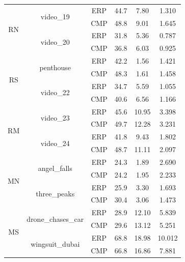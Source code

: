 \begin{longtable}{|c|c|c|c|c|c|}
\multirow{4}{*}{RN} & \multirow{2}{*}{video\_19}    & ERP &  44.7 &   7.80 &   1.310 \\ \cline{3-6}
                             &                      & CMP &  48.8 &   9.01 &   1.645 \\ \cline{2-6}
   & \multirow{2}{*}{video\_20}                     & ERP &  31.8 &   5.36 &   0.787 \\ \cline{3-6}
                             &                      & CMP &  36.8 &   6.03 &   0.925 \\ \hline
                             
\multirow{4}{*}{RS} & \multirow{2}{*}{penthouse}    & ERP &  42.2 &   1.56 &   1.421 \\ \cline{3-6}
                             &                      & CMP &  48.3 &   1.61 &   1.458 \\ \cline{2-6}
   & \multirow{2}{*}{video\_22}                     & ERP &  34.7 &   5.59 &   1.055 \\ \cline{3-6}
                             &                      & CMP &  40.6 &   6.56 &   1.166 \\ \hline
                             
\multirow{4}{*}{RM} & \multirow{2}{*}{video\_23}    & ERP &  45.6 &  10.95 &   3.398 \\ \cline{3-6}
                             &                      & CMP &  49.7 &  12.28 &   3.231 \\ \cline{2-6}
   & \multirow{2}{*}{video\_24}                     & ERP &  41.8 &   9.43 &   1.802 \\ \cline{3-6}
                             &                      & CMP &  48.7 &  11.11 &   2.097 \\ \hline
                             
\multirow{4}{*}{MN} & \multirow{2}{*}{angel\_falls} & ERP &  24.3 &   1.89 &   2.690 \\ \cline{3-6}
                             &                      & CMP &  24.2 &   1.95 &   2.233 \\\cline{2-6}
   & \multirow{2}{*}{three\_peaks}                  & ERP &  25.9 &   3.30 &   1.693 \\ \cline{3-6}
                             &                      & CMP &  30.4 &   3.06 &   1.473 \\ \hline
                             
\multirow{4}{*}{MS} & \multirow{2}{*}{drone\_chases\_car}   & ERP &  28.9 &  12.10 &   5.839 \\ \cline{3-6}
                             &                              & CMP &  29.6 &  13.12 &   5.251 \\ \cline{2-6}
   & \multirow{2}{*}{wingsuit\_dubai}                       & ERP &  68.8 &  18.98 &  10.012 \\ \cline{3-6}
                             &                              & CMP &  66.8 &  16.86 &   7.881 \\ \hline
                             


\end{longtable}
